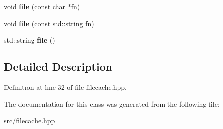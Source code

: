\begin{DoxyCompactItemize}
\item 
void {\bfseries file} (const char $\ast$fn)\hypertarget{class_filecache_ac3a0c5b2ce0fbecdbeef4c1237b381eb}{}\label{class_filecache_ac3a0c5b2ce0fbecdbeef4c1237b381eb}

\item 
void {\bfseries file} (const std\+::string fn)\hypertarget{class_filecache_a03a1e1ff174ea0ceece3406fff3de816}{}\label{class_filecache_a03a1e1ff174ea0ceece3406fff3de816}

\item 
std\+::string {\bfseries file} ()\hypertarget{class_filecache_ad05d79cf663161cc918cc972c54e9469}{}\label{class_filecache_ad05d79cf663161cc918cc972c54e9469}

\end{DoxyCompactItemize}


\subsection{Detailed Description}


Definition at line 32 of file filecache.\+hpp.



The documentation for this class was generated from the following file\+:\begin{DoxyCompactItemize}
\item 
src/filecache.\+hpp\end{DoxyCompactItemize}
